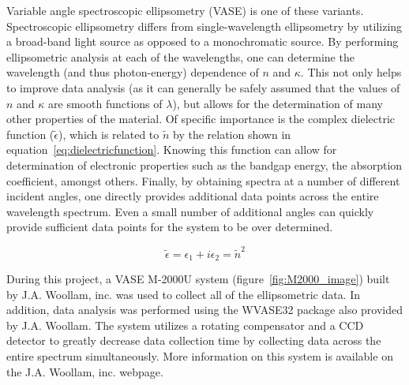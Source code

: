 Variable angle spectroscopic ellipsometry (VASE) is one of these variants. Spectroscopic ellipsometry differs from single-wavelength ellipsometry by utilizing a broad-band light source as opposed to a monochromatic source. By performing ellipsometric analysis at each of the wavelengths, one can determine the wavelength (and thus photon-energy) dependence of $n$ and $\kappa$. This not only helps to improve data analysis (as it can generally be safely assumed that the values of $n$ and $\kappa$ are smooth functions of $\lambda$), but allows for the determination of many other properties of the material. Of specific importance is the complex dielectric function ($\tilde{\epsilon}$), which is related to $\tilde{n}$ by the relation shown in equation~\ref{eq:dielectricfunction}. Knowing this function can allow for determination of electronic properties such as the bandgap energy, the absorption coefficient, amongst others. Finally, by obtaining spectra at a number of different incident angles, one directly provides additional data points across the entire wavelength spectrum. Even a small number of additional angles can quickly provide sufficient data points for the system to be over determined. 

\begin{equation}
 \label{eq:dielectricfunction}
 \displaystyle
	\tilde{\epsilon} = \epsilon_{1} + i\epsilon_{2} = \tilde{n}^{2}
\end{equation}

During this project, a VASE M-2000U system (figure~\ref{fig:M2000_image}) built by J.A. Woollam, inc. was used to collect all of the ellipsometric data. In addition, data analysis was performed using the WVASE32 package also provided by J.A. Woollam. The system utilizes a rotating compensator and a CCD detector to greatly decrease data collection time by collecting data across the entire spectrum simultaneously.  More information on this system is available on the J.A. Woollam, inc. webpage.\cite{woollam-web}

